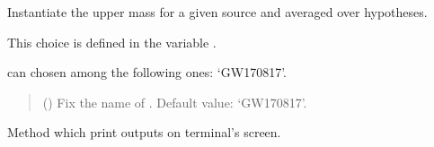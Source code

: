 \documentclass[letterpaper,10pt,english]{sphinxmanual}
\begin{document}
\begin{fulllineitems}
\label{\detokenize{source/api/setup_astro_mup:nucleardatapy.setup_astro_mup.SetupAstroMupAverage}}
\pysigstartsignatures
\pysiglinewithargsret
{}
{}
{}
\pysigstopsignatures
\sphinxAtStartPar
Instantiate the upper mass for a given source and averaged over hypotheses.

\sphinxAtStartPar
This choice is defined in the variable .

\sphinxAtStartPar
{} can chosen among the following ones: ‘GW170817’.
\begin{quote}\begin{description}
\sphinxAtStartPar
{} (\sphinxstyleliteralemphasis{\sphinxupquote{, }}) \textendash{} Fix the name of . Default value: ‘GW170817’.

\end{description}\end{quote}

\sphinxAtStartPar
{}

\begin{fulllineitems}
\label{\detokenize{source/api/setup_astro_mup:nucleardatapy.setup_astro_mup.SetupAstroMupAverage.print_outputs}}
\pysigstartsignatures
\pysiglinewithargsret
{}
{}
{}
\pysigstopsignatures
\sphinxAtStartPar
Method which print outputs on terminal’s screen.

\end{fulllineitems}


\end{fulllineitems}

\end{document}
